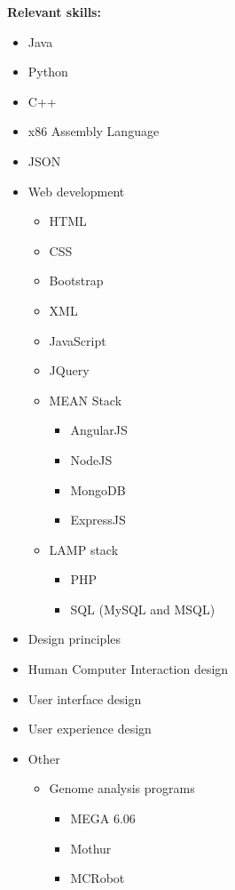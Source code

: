 \documentclass[12pt,a4paper]{article}
\begin{document}
		\parbox{\textwidth}{
			\textbf{\small Relevant skills:}
			\begin{itemize}\itemsep0em
				\item Java
				\item Python
				\item C++
				\item x86 Assembly Language
				\item JSON
				\item Web development
				\begin{itemize}\itemsep0em
					\item HTML
					\item CSS
					\item Bootstrap
					\item XML
					\item JavaScript
					\item JQuery
					\item MEAN Stack
					\begin{itemize}\itemsep0em
						\item AngularJS
						\item NodeJS
						\item MongoDB
						\item ExpressJS
					\end{itemize}
					\item LAMP stack
					\begin{itemize}\itemsep0em
						\item PHP
						\item SQL (MySQL and MSQL)
					\end{itemize}
				\end{itemize}
				\item Design principles
				\item Human Computer Interaction design
				\item User interface design
				\item User experience design
				\item Other
				\begin{itemize}\itemsep0em
					\item Genome analysis programs
					\begin{itemize}\itemsep0em
						\item MEGA 6.06
						\item Mothur
						\item MCRobot
					\end{itemize}
				\end{itemize}
			\end{itemize}
		}
\end{document}
